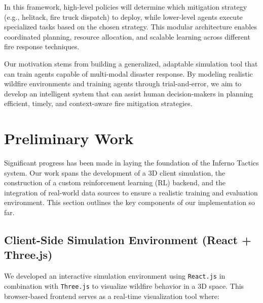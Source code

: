 \documentclass[conference]{IEEEtran}
\begin{document}
\noindent
In this framework, high-level policies will determine which mitigation strategy (e.g., helitack, fire truck dispatch) to deploy, while lower-level agents execute specialized tasks based on the chosen strategy. This modular architecture enables coordinated planning, resource allocation, and scalable learning across different fire response techniques.

\noindent
Our motivation stems from building a generalized, adaptable simulation tool that can train agents capable of multi-modal disaster response. By modeling realistic wildfire environments and training agents through trial-and-error, we aim to develop an intelligent system that can assist human decision-makers in planning efficient, timely, and context-aware fire mitigation strategies.




\section{Preliminary Work}

Significant progress has been made in laying the foundation of the Inferno Tactics system. Our work spans the development of a 3D client simulation, the construction of a custom reinforcement learning (RL) backend, and the integration of real-world data sources to ensure a realistic training and evaluation environment. This section outlines the key components of our implementation so far.

\subsection{Client-Side Simulation Environment (React + Three.js)}
We developed an interactive simulation environment using \texttt{React.js} in combination with \texttt{Three.js} to visualize wildfire behavior in a 3D space. This browser-based frontend serves as a real-time visualization tool where:
\end{document}
